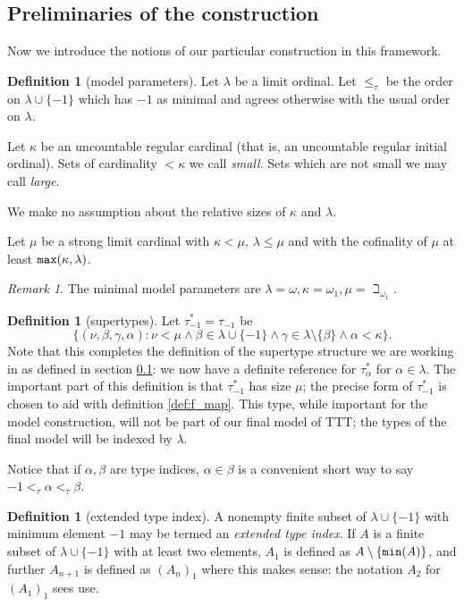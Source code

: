 \documentclass[112pt]{article}
\theoremstyle{definition}
\newtheorem{definition}[theorem]{Definition}
\theoremstyle{remark}
\newtheorem{remark}[theorem]{Remark}
\begin{document}
\subsection{Preliminaries of the construction}
\label{ss:preliminaries}

Now we introduce the notions of our particular construction in this framework.
\begin{definition}[model parameters]\label{def:model_params}
Let $\lambda$ be a limit ordinal.  Let $\leq_\tau$ be the order on $\lambda \cup \{-1\}$ which has $-1$ as minimal and agrees otherwise with the usual order on $\lambda$.

Let $\kappa$ be an uncountable regular cardinal (that is, an uncountable  regular initial ordinal).  Sets of cardinality $<\kappa$ we call {\em small\/}.  Sets which are not small we may call {\em large\/}.

We make no assumption about the relative sizes of $\kappa$ and $\lambda$.

Let $\mu$ be a strong limit cardinal with $\kappa<\mu$, $\lambda \leq \mu$ and with the cofinality of $\mu$ at least ${\tt max}(\kappa,\lambda)$.
\end{definition}
\begin{remark}\label{rk:example_model_params}
{The minimal model parameters are $\lambda = \omega, \kappa = \omega_1, \mu = \beth_{\omega_1}$.}
\end{remark}

\begin{definition}[supertypes]\label{def:supertypes}
Let $\tau^*_{-1}=\tau_{-1}$ be $$\{(\nu,\beta,\gamma,\alpha):\nu<\mu \wedge  \beta \in \lambda\cup \{-1\} \wedge \gamma \in \lambda \setminus \{\beta\}\wedge \alpha<\kappa\}.$$  Note that this completes the definition of the supertype structure we are working in as defined in section \ref{ss:preliminaries}:  we now have a definite reference
for $\tau^*_\alpha$ for $\alpha\in \lambda$.
The important part of this definition is that $\tau_{-1}^*$ has size $\mu$; the precise form of $\tau_{-1}^*$ is chosen to aid with definition \ref{def:f_map}. This type, while important for the model construction, will not be part of our final model of TTT; the types of the final model  will be indexed by $\lambda$.
\end{definition}

Notice that if $\alpha,\beta$ are type indices, $\alpha\in \beta$ is a convenient short way to say $-1 <_\tau \alpha <_\tau \beta$.

\begin{definition}[extended type index]\label{def:extended_type_index}
A nonempty finite subset of $\lambda \cup \{-1\}$ {with minimum element $-1$} may be termed an {\em extended type index}.  If $A$ is a finite subset of $\lambda\cup \{-1\}$  with at least two elements, $A_1$ is defined as $A \setminus \{{\tt min}(A)\}$, and further $A_{n+1}$ is defined as $(A_n)_1$ where this makes sense:  the notation $A_2$ for $(A_1)_1$ sees use.
\end{definition}
\end{document}
